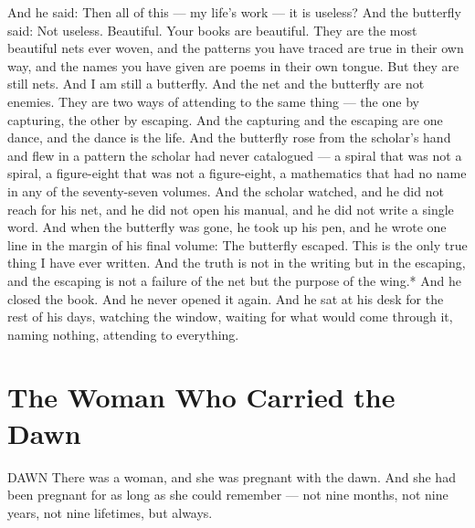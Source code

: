 \documentclass[12pt,openany]{book}
\begin{document}
And he said: Then all of this --- my life's work --- it is useless? And the butterfly said: Not useless. Beautiful. Your books are beautiful. They are the most beautiful nets ever woven, and the patterns you have traced are true in their own way, and the names you have given are poems in their own tongue. But they are still nets. And I am still a butterfly. And the net and the butterfly are not enemies. They are two ways of attending to the same thing --- the one by capturing, the other by escaping. And the capturing and the escaping are one dance, and the dance is the life. And the butterfly rose from the scholar's hand and flew in a pattern the scholar had never catalogued --- a spiral that was not a spiral, a figure-eight that was not a figure-eight, a mathematics that had no name in any of the seventy-seven volumes. And the scholar watched, and he did not reach for his net, and he did not open his manual, and he did not write a single word. And when the butterfly was gone, he took up his pen, and he wrote one line in the margin of his final volume: The butterfly escaped. This is the only true thing I have ever written. And the truth is not in the writing but in the escaping, and the escaping is not a failure of the net but the purpose of the wing.* And he closed the book. And he never opened it again. And he sat at his desk for the rest of his days, watching the window, waiting for what would come through it, naming nothing, attending to everything.


\chapter{The Woman Who Carried the Dawn}

DAWN There was a woman, and she was pregnant with the dawn. And she had been pregnant for as long as she could remember --- not nine months, not nine years, not nine lifetimes, but always.
\end{document}
